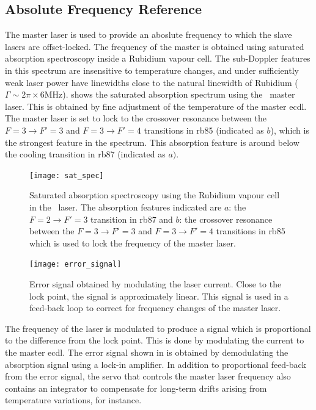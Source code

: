 \subsection{Absolute Frequency Reference}\label{subsec:muquans_master}
The master laser is used to provide an aboslute frequency to which the slave
lasers are offset-locked. The frequency of the master is obtained using
saturated absorption spectroscopy inside a Rubidium vapour cell. The sub-Doppler
features in this spectrum are insensitive to temperature changes, and under
sufficiently weak laser power have linewidths close to the natural linewidth of
Rubidium (\(\Gamma \sim 2\pi \times 6\)MHz). 
shows the saturated absorption spectrum using the \Muquans\ master laser. This
is obtained by fine adjustment of the temperature of the master \ac{ecdl}. The
master laser is set to lock to the crossover resonance between the \(F = 3
\rightarrow F' = 3\) and \(F = 3 \rightarrow F' =4 \) transitions in \ac{rb85}
(indicated as \(b\)), which is the strongest feature in the spectrum. This
absorption feature is around  below the cooling
transition in \ac{rb87} (indicated as \(a)\).
\begin{figure}[!htbp]
	\texttt{[image: sat\_spec]}
	\caption[Saturated absorption spectroscopy of the \\Muquans\ master laser.]{Saturated absorption spectroscopy using the Rubidium vapour cell in the \Muquans\ laser. The absorption features indicated are \(a\): the \(F = 2 \rightarrow F' = 3\) transition in \ac{rb87} and \(b\): the crossover resonance between the \(F = 3 \rightarrow F' = 3\) and \(F = 3 \rightarrow F' = 4 \) transitions in \ac{rb85} which is used to lock the frequency of the master laser.}\label{fig:muquans_satspec}
\end{figure}
\begin{figure}[!htbp]
	\texttt{[image: error\_signal]}
	\caption[Error Signal for the \Muquans\ master servo.]{Error signal obtained by modulating the laser current. Close to the lock point, the signal is approximately linear. This signal is used in a feed-back loop to correct for frequency changes of the master laser.}\label{fig:muquans_error_signal}
\end{figure}
The frequency of the laser is modulated to produce a signal which is
proportional to the difference from the lock point. This is done by modulating
the current to the master \ac{ecdl}. The error signal shown in
 is obtained by demodulating the absorption
signal using a lock-in amplifier. In addition to proportional feed-back from the
error signal, the servo that controls the master laser frequency also contains
an integrator to compensate for long-term drifts arising from temperature
variations, for instance.
